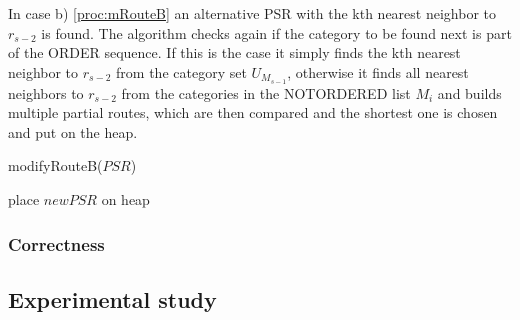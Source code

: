 In case b) \ref{proc:mRouteB} an alternative PSR with the kth nearest neighbor to $r_{s-2}$ is found. The algorithm checks again if the category to be found next is part of the ORDER sequence. If this is the case it simply finds the kth nearest neighbor to $r_{s-2}$ from the category set $U_{M_{s-1}}$, otherwise it finds all nearest neighbors to $r_{s-2}$ from the categories in the NOTORDERED list $M_{i}$ and builds multiple partial routes, which are then compared and the shortest one is chosen and put on the heap. \newline

\begin{procedure}[H]
	\label{proc:mRouteB}
	\caption{modifyRouteB($PSR$)}
	

	place $newPSR$ on heap\;
\end{procedure}


\subsubsection{Correctness}
\label{sec:correctnessOrder}

\subsection{Experimental study}
\label{sec:experimentsOrder}
